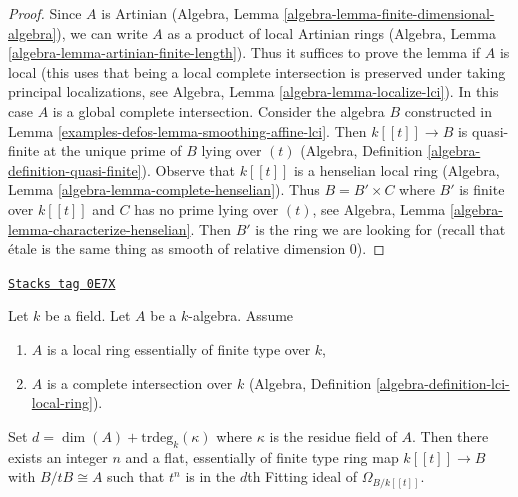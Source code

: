 \begin{proof}
Since $A$ is Artinian
(Algebra, Lemma \ref{algebra-lemma-finite-dimensional-algebra}),
we can write $A$ as a product of local Artinian rings
(Algebra, Lemma \ref{algebra-lemma-artinian-finite-length}).
Thus it suffices to prove the lemma if $A$ is local
(this uses that being a local complete intersection is
preserved under taking principal localizations, see
Algebra, Lemma \ref{algebra-lemma-localize-lci}).
In this case $A$ is a global complete intersection.
Consider the algebra $B$ constructed in
Lemma \ref{examples-defos-lemma-smoothing-affine-lci}.
Then $k[[t]] \to B$ is quasi-finite at the unique prime of $B$
lying over $(t)$ (Algebra, Definition \ref{algebra-definition-quasi-finite}).
Observe that $k[[t]]$ is a henselian local ring
(Algebra, Lemma \ref{algebra-lemma-complete-henselian}).
Thus $B = B' \times C$ where $B'$ is finite over $k[[t]]$
and $C$ has no prime lying over $(t)$, see
Algebra, Lemma \ref{algebra-lemma-characterize-henselian}.
Then $B'$ is the ring we are looking for
(recall that \'etale is the same thing as
smooth of relative dimension $0$).
\end{proof}

\begin{lemma}
\label{examples-defos-lemma-smoothing-at-lci-point}
\href{https://stacks.math.columbia.edu/tag/0E7X}{\texttt{Stacks tag 0E7X}}

Let $k$ be a field. Let $A$ be a $k$-algebra. Assume
\begin{enumerate}
\item $A$ is a local ring essentially of finite type over $k$,
\item $A$ is a complete intersection over $k$
(Algebra, Definition \ref{algebra-definition-lci-local-ring}).
\end{enumerate}
Set $d = \dim(A) + \text{trdeg}_k(\kappa)$ where $\kappa$
is the residue field of $A$. Then there exists an integer $n$
and a flat, essentially of finite type ring map
$k[[t]] \to B$ with $B/tB \cong A$ such that $t^n$ is in the
$d$th Fitting ideal of $\Omega_{B/k[[t]]}$.
\end{lemma}

